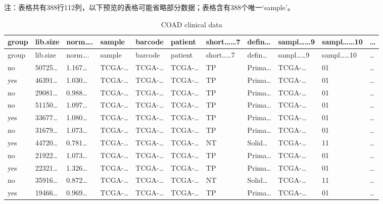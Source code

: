 \documentclass[
]{article}
\begin{document}
\begin{center}\begin{tcolorbox}[colback=gray!10, colframe=gray!50, width=0.9\linewidth, arc=1mm, boxrule=0.5pt]注：表格共有388行112列，以下预览的表格可能省略部分数据；表格含有388个唯一`sample'。
\end{tcolorbox}
\end{center}

\begin{longtable}[]{@{}lllllllllll@{}}
\caption{\label{tab:COAD-clinical-data}COAD clinical data}\tabularnewline
\toprule
group & lib.size & norm\ldots. & sample & barcode & patient & short\ldots\ldots7 & defin\ldots{} & sampl\ldots\ldots9 & sampl\ldots\ldots10 & \ldots{}\tabularnewline
\midrule
\endfirsthead
\toprule
group & lib.size & norm\ldots. & sample & barcode & patient & short\ldots\ldots7 & defin\ldots{} & sampl\ldots\ldots9 & sampl\ldots\ldots10 & \ldots{}\tabularnewline
\midrule
\endhead
no & 50725\ldots{} & 1.167\ldots{} & TCGA-\ldots{} & TCGA-\ldots{} & TCGA-\ldots{} & TP & Prima\ldots{} & TCGA-\ldots{} & 01 & \ldots{}\tabularnewline
yes & 46391\ldots{} & 1.030\ldots{} & TCGA-\ldots{} & TCGA-\ldots{} & TCGA-\ldots{} & TP & Prima\ldots{} & TCGA-\ldots{} & 01 & \ldots{}\tabularnewline
no & 29081\ldots{} & 0.988\ldots{} & TCGA-\ldots{} & TCGA-\ldots{} & TCGA-\ldots{} & TP & Prima\ldots{} & TCGA-\ldots{} & 01 & \ldots{}\tabularnewline
no & 51150\ldots{} & 1.097\ldots{} & TCGA-\ldots{} & TCGA-\ldots{} & TCGA-\ldots{} & TP & Prima\ldots{} & TCGA-\ldots{} & 01 & \ldots{}\tabularnewline
yes & 33677\ldots{} & 1.080\ldots{} & TCGA-\ldots{} & TCGA-\ldots{} & TCGA-\ldots{} & TP & Prima\ldots{} & TCGA-\ldots{} & 01 & \ldots{}\tabularnewline
no & 31679\ldots{} & 1.073\ldots{} & TCGA-\ldots{} & TCGA-\ldots{} & TCGA-\ldots{} & TP & Prima\ldots{} & TCGA-\ldots{} & 01 & \ldots{}\tabularnewline
yes & 44720\ldots{} & 0.781\ldots{} & TCGA-\ldots{} & TCGA-\ldots{} & TCGA-\ldots{} & NT & Solid\ldots{} & TCGA-\ldots{} & 11 & \ldots{}\tabularnewline
no & 21922\ldots{} & 1.073\ldots{} & TCGA-\ldots{} & TCGA-\ldots{} & TCGA-\ldots{} & TP & Prima\ldots{} & TCGA-\ldots{} & 01 & \ldots{}\tabularnewline
yes & 22321\ldots{} & 1.326\ldots{} & TCGA-\ldots{} & TCGA-\ldots{} & TCGA-\ldots{} & TP & Prima\ldots{} & TCGA-\ldots{} & 01 & \ldots{}\tabularnewline
no & 35916\ldots{} & 0.872\ldots{} & TCGA-\ldots{} & TCGA-\ldots{} & TCGA-\ldots{} & NT & Solid\ldots{} & TCGA-\ldots{} & 11 & \ldots{}\tabularnewline
yes & 19466\ldots{} & 0.969\ldots{} & TCGA-\ldots{} & TCGA-\ldots{} & TCGA-\ldots{} & TP & Prima\ldots{} & TCGA-\ldots{} & 01 & \ldots{}\tabularnewline

\end{longtable}
\end{document}
